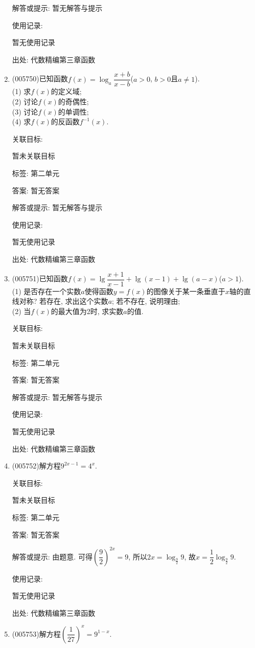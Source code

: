 \documentclass[10pt,a4paper]{article}
\begin{document}
\begin{enumerate}[1.]
解答或提示: 暂无解答与提示

使用记录:

暂无使用记录


出处: 代数精编第三章函数
\item { (005750)}已知函数$f(x)=\log_a\dfrac{x+b}{x-b}$($a>0$, $b>0$且$a\ne 1$).\\
(1) 求$f(x)$的定义域;\\
(2) 讨论$f(x)$的奇偶性;\\
(3) 讨论$f(x)$的单调性;\\
(4) 求$f(x)$的反函数$f^{-1}(x)$.


关联目标:

暂未关联目标



标签: 第二单元

答案: 暂无答案

解答或提示: 暂无解答与提示

使用记录:

暂无使用记录


出处: 代数精编第三章函数
\item { (005751)}已知函数$f(x)=\lg \dfrac{x+1}{x-1}+\lg (x-1)+\lg (a-x)$($a>1$).\\
(1) 是否存在一个实数$a$使得函数$y=f(x)$的图像关于某一条垂直于$x$轴的直线对称? 若存在, 求出这个实数$a$; 若不存在, 说明理由;\\
(2) 当$f(x)$的最大值为2时, 求实数$a$的值.


关联目标:

暂未关联目标



标签: 第二单元

答案: 暂无答案

解答或提示: 暂无解答与提示

使用记录:

暂无使用记录


出处: 代数精编第三章函数
\item { (005752)}解方程$9^{2x-1}=4^x$.


关联目标:

暂未关联目标



标签: 第二单元

答案: 暂无答案

解答或提示: 由题意. 可得$(\dfrac 92)^{2x}=9$, 所以$ 2x=\log_{\frac 92}9$, 故$x=\dfrac 12\log_{\frac 92}9$.

使用记录:

暂无使用记录


出处: 代数精编第三章函数
\item { (005753)}解方程$(\dfrac 1{27})^x=9^{1-x}$.



\end{enumerate}
\end{document}
